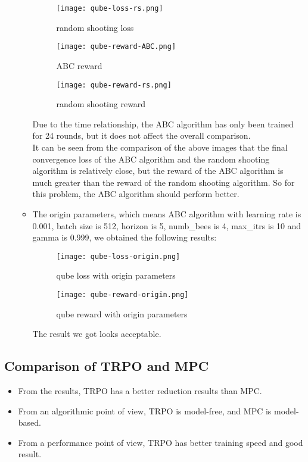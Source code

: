 \documentclass[12pt]{article}
\begin{document}
\begin{enumerate}
\begin{itemize}
    \begin{figure}[H]
      \centering
      \texttt{[image: qube-loss-rs.png]}
      \caption{random shooting loss}
    \end{figure}

    \begin{figure}[H]
      \centering
      \texttt{[image: qube-reward-ABC.png]}
      \caption{ABC reward}
    \end{figure}
  
    \begin{figure}[H]
      \centering
      \texttt{[image: qube-reward-rs.png]}
      \caption{random shooting reward}
    \end{figure}
    Due to the time relationship, the ABC algorithm has only been trained for 24 rounds, but it does not affect the overall comparison.\\
    It can be seen from the comparison of the above images that the final convergence loss of the ABC algorithm and the random shooting algorithm is relatively close, but the reward of the ABC algorithm is much greater than the reward of the random shooting algorithm. So for this problem, the ABC algorithm should perform better.\\

    \item The origin parameters, which means ABC algorithm with learning rate is 0.001, batch size is 512, horizon is 5, numb\_bees is 4, max\_itrs is 10 and gamma is 0.999, we obtained the following results:
    \begin{figure}[H]
      \centering
      \texttt{[image: qube-loss-origin.png]}
      \caption{qube loss with origin parameters}
    \end{figure}
  
    \begin{figure}[H]
      \centering
      \texttt{[image: qube-reward-origin.png]}
      \caption{qube reward with origin parameters}
    \end{figure}
    The result we got looks acceptable.
  \end{itemize}
\end{enumerate}

\newpage
\subsection{Comparison of TRPO and MPC}

\begin{itemize}
  \item From the results, TRPO has a better reduction results than MPC.
  \item From an algorithmic point of view, TRPO is model-free, and MPC is model-based.
  \item From a performance point of view, TRPO has better training speed and good result.
\end{itemize}
\end{document}
